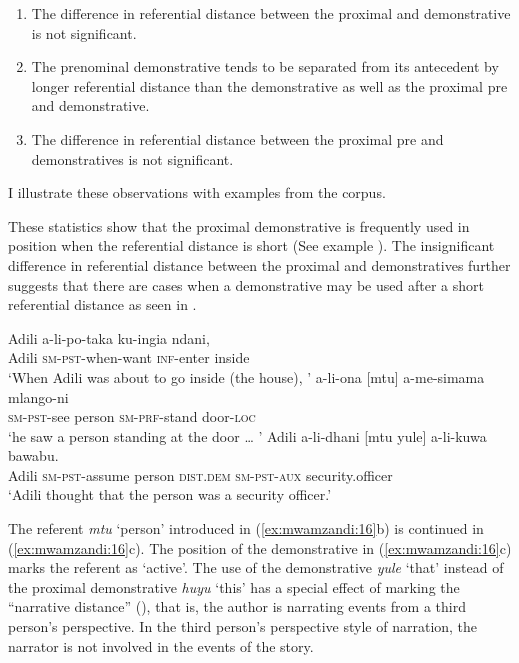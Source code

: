 \documentclass[output=paper,
modfonts
]{langscibook}
\begin{document}
\begin{enumerate}
 \item The difference in referential distance between the proximal and   demonstrative is not significant.

 \item The  prenominal demonstrative tends to be separated from its antecedent by longer referential distance than the   demonstrative as well as the proximal pre and  demonstrative.

 \item The difference in referential distance between the proximal pre and  demonstratives is not significant.

\end{enumerate}
 

I illustrate these observations with examples from the corpus.

These statistics show that the proximal demonstrative is frequently used in  position when the referential distance is short (See example ). The insignificant difference in referential distance between the proximal and   demonstratives further suggests that there are cases when a   demonstrative may be used after a short referential distance as seen in .

\ea\label{ex:mwamzandi:16}
\ea 
\gll  Adili a-li-po-taka ku-ingia ndani,\\
     Adili \textsc{sm}{}-\textsc{pst}{}-when-want \textsc{inf}{}-enter inside\\
\glt ‘When Adili was about to go inside (the house), ’
\ex
\gll  a-li-ona [mtu] a-me-simama mlango-ni\\
     \textsc{sm}{}-\textsc{pst}{}-see person \textsc{sm}{}-\textsc{prf}{}-stand door-\textsc{loc}\\
\glt ‘he saw a person standing at the door {\dots} ’
\ex
\gll  Adili a-li-dhani [mtu yule] a-li-kuwa bawabu.\\
     Adili \textsc{sm}{}-\textsc{pst}{}-assume person \textsc{dist}.\textsc{dem} \textsc{sm}{}-\textsc{pst}{}-\textsc{aux} security.officer\\
\glt ‘Adili thought that the person was a security officer.’
\z
\z

The referent \textit{mtu} ‘person’ introduced in (\ref{ex:mwamzandi:16}b) is continued in (\ref{ex:mwamzandi:16}c). The  position of the demonstrative in (\ref{ex:mwamzandi:16}c) marks the referent as ‘active’. The use of the   demonstrative \textit{yule} ‘that’ instead of the proximal demonstrative \textit{huyu} ‘this’ has a special effect of marking the “narrative distance” (\citealt{Leonardo1987,Wilt1987}), that is, the author is narrating events from a third person’s perspective. In the third person’s perspective style of narration, the narrator is not involved in the events of the story.
\end{document}
